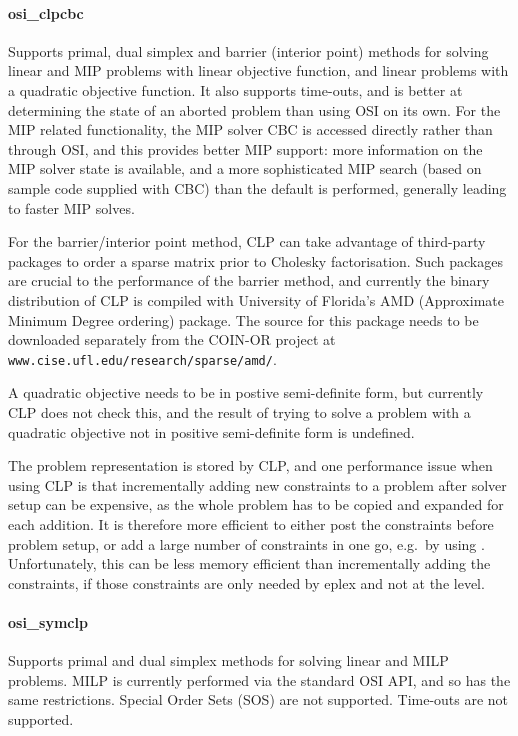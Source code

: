 \paragraph{osi_clpcbc} Supports primal, dual simplex and barrier (interior
point) methods for
solving linear and MIP problems with linear objective function, and linear
problems with a quadratic objective function. It also supports time-outs, and is better 
at determining the state of an aborted problem than using OSI on its own.
For the MIP related functionality, the MIP solver CBC is accessed directly
rather than through OSI, and this 
provides better MIP support: more information on the MIP
solver state is available, and a more sophisticated MIP search (based on
sample code supplied with CBC) than the default is performed, generally
leading to faster MIP solves.

For the barrier/interior point method, CLP can take advantage of
third-party packages to order a sparse matrix prior to Cholesky
factorisation. Such packages are crucial to the performance of the
barrier method, and currently the binary distribution of CLP is compiled
with University of Florida's AMD (Approximate Minimum Degree ordering) 
package. The source for this package needs to be downloaded separately from
the COIN-OR project at {\tt www.cise.ufl.edu/research/sparse/amd/}. 

A quadratic objective needs to be in postive semi-definite form, but
currently CLP does not check this, and the result of trying to solve a
problem with a quadratic objective not in positive semi-definite form
is undefined.

The problem representation is stored by CLP, and one performance issue 
when using CLP is that incrementally adding new constraints to
a problem after solver setup can be expensive, as the whole problem has to
be copied and expanded for each addition. It is therefore more efficient to 
either post the constraints before problem setup, or add a large number of
constraints in one go, e.g.\ by using 
.
Unfortunately, this can be less memory efficient than incrementally adding
the constraints, if those constraints are only needed by eplex and not at
the {\eclipse} level.

\paragraph{osi_symclp} Supports primal and dual simplex methods for
solving linear and MILP problems. MILP is currently performed via the 
standard OSI API, and so has the same restrictions. Special Order Sets
(SOS) are not supported. Time-outs are not supported.
 
